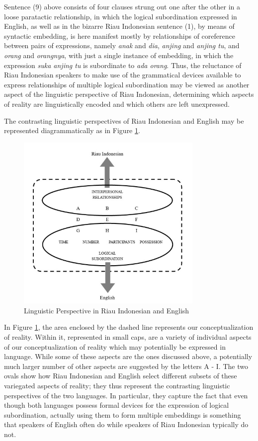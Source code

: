 \documentclass[output=paper,colorlinks,citecolor=brown
]{langscibook}
\begin{document}
Sentence (9) above consists of four clauses strung out one after the other in a loose paratactic relationship, in which the logical subordination expressed in English, as well as in the bizarre Riau Indonesian sentence (1), by means of syntactic embedding, is here manifest mostly by relationships of coreference between pairs of expressions, namely \emph{anak} and \emph{dia}, \emph{anjing} and \emph{anjing tu}, and \emph{orang} and \emph{orangnya}, with just a single instance of embedding, in which the expression \emph{suka anjing tu} is subordinate to \emph{ada orang}.  Thus, the reluctance of Riau Indonesian speakers to make use of the grammatical devices available to express relationships of multiple logical subordination may be viewed as another aspect of the linguistic perspective of Riau Indonesian, determining which aspects of reality are linguistically encoded and which others are left unexpressed.

The contrasting linguistic perspectives of Riau Indonesian and English may be represented diagrammatically as in Figure \ref{fig:fig4}.

\begin{figure}[hbt!]
\centering
\includegraphics[width=0.8\textwidth]{gil_figure4.png}
\caption{\label{fig:fig4}Linguistic Perspective in Riau Indonesian and English}
\end{figure}

In Figure \ref{fig:fig4}, the area enclosed by the dashed line represents our conceptualization of reality.  Within it, represented in small caps, are a variety of individual aspects of our conceptualization of reality which may potentially be expressed in language.  While some of these aspects are the ones discussed above, a potentially much larger number of other aspects are suggested by the letters A - I.  The two ovals show how Riau Indonesian and English select different subsets of these variegated aspects of reality; they thus represent the contrasting linguistic perspectives of the two languages.  In particular, they capture the fact that even though both languages possess formal devices for the expression of logical subordination, actually using them to form multiple embeddings is something that speakers of English often do while speakers of Riau Indonesian typically do not.
\end{document}
